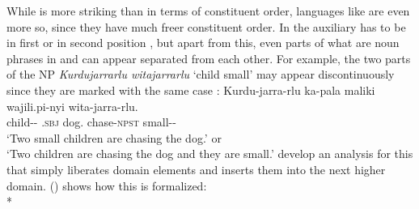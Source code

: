 \documentclass[output=paper
	        ,collection
	        ,collectionchapter
 	        ,biblatex
                ,babelshorthands
                ,newtxmath
                ,draftmode
                ,colorlinks, citecolor=brown
]{langscibook}
\begin{document}
While  is more striking than  in terms of constituent order, languages like
 are even more so, since they have much freer constituent order. In
 the auxiliary has to be in first or in second position \parencites[]{Laughren89a-u}[, 99]{Simpson91a-u}, %
but apart from this, even parts of what are noun
phrases in  and  can appear separated from each other. For example, the two parts of
the NP \emph{Kurdujarrarlu witajarrarlu} `child small' may appear discontinuously since they are marked with
the same case \citep[]{Simpson91a-u}:
\ea
\label{ex-warlpiri}
\gll Kurdu-jarra-rlu  ka-pala                 maliki     wajili.pi-nyi        wita-jarra-rlu.\\
     child-\DU-\ERG{} \DU.\textsc{sbj} dog.\ABS{} chase-\textsc{npst} small-\DU-\ERG\\%
\glt `Two small children are chasing the dog.' or\\
     `Two children are chasing the dog and they are small.'
\z
%
\citet{DS99a} develop an analysis for this that simply liberates domain elements and inserts them
into the next higher domain. () shows how this is formalized:
\ea
{} \impl\\*
\end{document}
